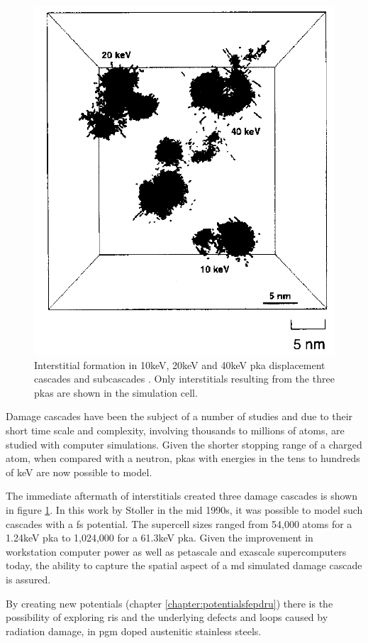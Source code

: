 \begin{figure}
  \begin{center}
    \includegraphics[width=.4\linewidth]{chapters/consequences_of_ionizing_radiation/images/stoller1996damage.png}
    \caption{Interstitial formation in 10keV, 20keV and 40keV \acrshort{pka} displacement cascades and subcascades \cite{stollerdamage1996}.  Only interstitials resulting from the three \acrshort{pka}s are shown in the simulation cell.}
    \label{fig:stollerdamage}
  \end{center}
\end{figure}

Damage cascades have been the subject of a number of studies and due to their short time scale and complexity, involving thousands to millions of atoms, are studied with computer simulations.  Given the shorter stopping range of a charged atom, when compared with a neutron, \acrshort{pka}s with energies in the tens to hundreds of keV are now possible to model.

The immediate aftermath of interstitials created three damage cascades is shown in figure \ref{fig:stollerdamage}\cite{stollerdamage1996}.  In this work by Stoller in the mid 1990s, it was possible to model such cascades with a \acrlong{fs} potential.  The supercell sizes ranged from 54,000 atoms for a 1.24keV \acrshort{pka} to 1,024,000 for a 61.3keV \acrshort{pka}.  Given the improvement in workstation computer power as well as petascale and exascale supercomputers today, the ability to capture the spatial aspect of a \acrshort{md} simulated damage cascade is assured.

By creating new potentials (chapter \ref{chapter:potentialsfepdru}) there is the possibility of exploring \acrshort{ris} and the underlying defects and loops caused by radiation damage, in \acrshort{pgm} doped austenitic stainless steels.



